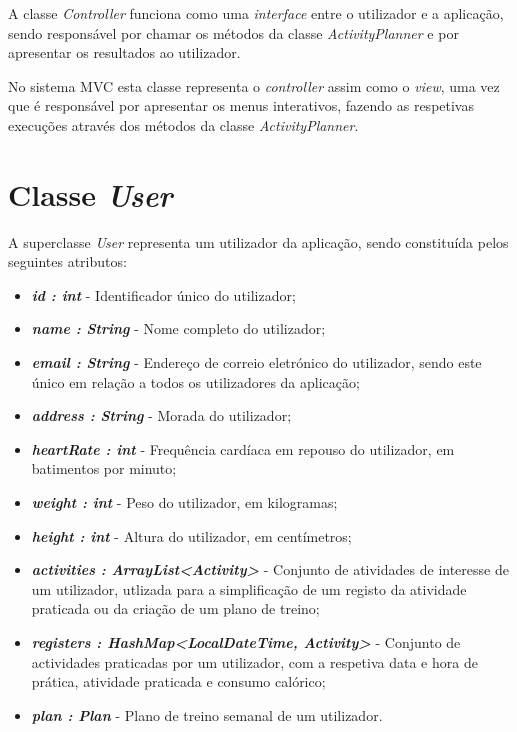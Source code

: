\documentclass[a4paper,12pt]{scrreprt}
\begin{document}
    A classe \textit{Controller} funciona como uma \textit{interface} entre o utilizador e a aplicação,
    sendo responsável por chamar os métodos da classe \textit{ActivityPlanner} e por apresentar os resultados ao utilizador.

    No sistema MVC esta classe representa o \textit{controller} assim como o \textit{view},
    uma vez que é responsável por apresentar os menus interativos,
    fazendo as respetivas execuções através dos métodos da classe \textit{ActivityPlanner}.

\section{Classe \textit{User}}
    A superclasse \textit{User} representa um utilizador da aplicação, sendo constituída pelos seguintes atributos:

    \begin{itemize}
        \item \textit{\textbf{id : int}} - Identificador único do utilizador;
        \item \textit{\textbf{name : String}} - Nome completo do utilizador;
        \item \textit{\textbf{email : String}} - Endereço de correio eletrónico do utilizador, sendo este único em relação a todos os utilizadores da aplicação;
        \item \textit{\textbf{address : String}} - Morada do utilizador;
        \item \textit{\textbf{heartRate : int}} - Frequência cardíaca em repouso do utilizador, em batimentos por minuto;
        \item \textit{\textbf{weight : int}} - Peso do utilizador, em kilogramas;
        \item \textit{\textbf{height : int}} - Altura do utilizador, em centímetros;
        \item \textit{\textbf{activities : ArrayList<Activity>}} - Conjunto de atividades de interesse de um utilizador, utlizada para a simplificação de um registo da atividade praticada ou da criação de um plano de treino;
        \item \textit{\textbf{registers : HashMap<LocalDateTime, Activity>}} - Conjunto de actividades praticadas por um utilizador, com a respetiva data e hora de prática, atividade praticada e consumo calórico;
        \item \textit{\textbf{plan : Plan}} - Plano de treino semanal de um utilizador.
    \end{itemize}
\end{document}
